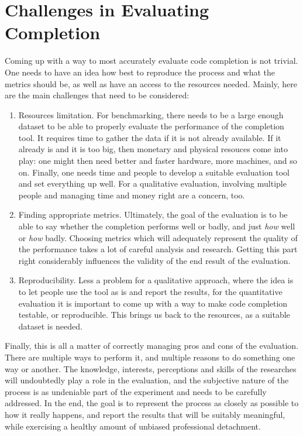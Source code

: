 \section{Challenges in Evaluating Completion}
\label{sec:Evaluation-Challenges}
Coming up with a way to most accurately evaluate code completion is not trivial. One needs to have an idea how best to reproduce the process and what the metrics should be, as well as have an access to the resources needed. Mainly, here are the main challenges that need to be considered:
\begin{enumerate}
    \item Resources limitation. For benchmarking, there needs to be a large enough dataset to be able to properly evaluate the performance of the completion tool. It requires time to gather the data if it is not already available. If it already is and it is too big, then monetary and physical resouces come into play: one might then need better and faster hardware, more machines, and so on. Finally, one needs time and people to develop a suitable evaluation tool and set everything up well. For a qualitative evaluation, involving multiple people and managing time and money right are a concern, too. 
    \item Finding appropriate metrics. Ultimately, the goal of the evaluation is to be able to say whether the completion performs well or badly, and just \textit{how} well or \textit{how} badly. Choosing metrics which will adequately represent the quality of the performance takes a lot of careful analysis and research. Getting this part right considerably influences the validity of the end result of the evaluation.
    \item Reproducibility. Less a problem for a qualitative approach, where the idea is to let people use the tool as is and report the results, for the quantitative evaluation it is important to come up with a way to make code completion testable, or reproducible. This brings us back to the resources, as a suitable dataset is needed.
\end{enumerate}

Finally, this is all a matter of correctly managing pros and cons of the evaluation. There are multiple ways to perform it, and multiple reasons to do something one way or another. The knowledge, interests, perceptions and skills of the researches will undoubtedly play a role in the evaluation, and the subjective nature of the process is as undeniable part of the experiment and needs to be carefully addressed. In the end, the goal is to represent the process as closely as possible to how it really happens, and report the results that will be suitably meaningful, while exercising a healthy amount of unbiased professional detachment.

